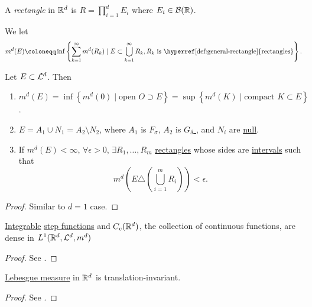 \begin{definition}\label{def:general-rectangle}
	A \emph{rectangle} in \(\mathbb{\MakeUppercase{r}} ^d\) is \(R = \prod\limits_{i=1}^{d} E_{i} \) where \(E_{i}\in \mathcal{\MakeUppercase{b}} (\mathbb{\MakeUppercase{r}} )\).
\end{definition}

\begin{definition}
	We let
	\[
		m^d(E) \coloneqq \inf \left\{\sum\limits_{k=1}^{\infty} m^d(R_{k} )\mid E\subset \bigcup\limits_{k=1}^{\infty} R_{k} , R_{k} \text{ is \hyperref[def:general-rectangle]{rectangles}}\right\}.
	\]
\end{definition}
\begin{theorem}
	Let \(E\subset \mathcal{\MakeUppercase{l}} ^d\). Then
	\begin{enumerate}
		\item \(m^d(E) = \inf \left\{m^d (0) \mid \text{open } O\supset E \right\} = \sup \left\{m^d (K)\mid \text{compact }K\subset E \right\}\).
		\item \(E = A_1 \cup N_1 = A_2 \setminus N_2\), where \(A_1\) is \hyperref[def:F-sigma-set]{\(F_\sigma \)}, \(A_2\) is \hyperref[def:G-delta-set]{\(G_\delta \) }, and \(N_{i} \) are \hyperref[def:mu-null-set]{null}.
		\item If \(m^d(E)<\infty \), \(\forall \epsilon >0\), \(\exists R_1, \ldots , R_m \) \hyperref[def:general-rectangle]{rectangles} whose sides are \underline{intervals} such that
		      \[
			      m^d \left(E\triangle \left(\bigcup\limits_{i=1}^{m} R_{i} \right)\right)< \epsilon .
		      \]
	\end{enumerate}
\end{theorem}
\begin{proof}
	Similar to \(d = 1\) case.
\end{proof}

\begin{theorem}
	\hyperref[def:integrable]{Integrable} \hyperref[def:step-function]{step functions} and \(C_c(\mathbb{\MakeUppercase{r}} ^d)\), the collection
	of continuous functions, are dense in \(L^1(\mathbb{\MakeUppercase{r}} ^d, \mathcal{\MakeUppercase{l}} ^d, m^d)\)
\end{theorem}
\begin{proof}
	See \cite{folland1999real}.
\end{proof}

\begin{theorem}
	\hyperref[def:Lebesgue-measure]{Lebesgue measure} in \(\mathbb{\MakeUppercase{r}} ^d\) is translation-invariant.
\end{theorem}
\begin{proof}
	See \cite{folland1999real}.
\end{proof}

